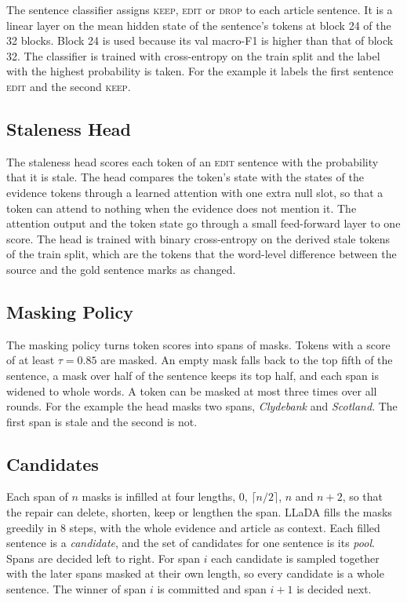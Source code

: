 \documentclass[]{paper}
\newcommand{\keep}{\textsc{keep}}
\newcommand{\edit}{\textsc{edit}}
\newcommand{\drop}{\textsc{drop}}
\begin{document}
The sentence classifier assigns \keep{}, \edit{} or \drop{} to each article sentence. It is a linear layer on the mean hidden state of the sentence's tokens at block 24 of the 32 blocks. Block 24 is used because its val macro-F1 is higher than that of block 32. The classifier is trained with cross-entropy on the train split and the label with the highest probability is taken. For the example it labels the first sentence \edit{} and the second \keep{}.

\subsection{Staleness Head}

The staleness head scores each token of an \edit{} sentence with the probability that it is stale. The head compares the token's state with the states of the evidence tokens through a learned attention with one extra null slot, so that a token can attend to nothing when the evidence does not mention it. The attention output and the token state go through a small feed-forward layer to one score. The head is trained with binary cross-entropy on the derived stale tokens of the train split, which are the tokens that the word-level difference between the source and the gold sentence marks as changed.

\subsection{Masking Policy}

The masking policy turns token scores into spans of masks. Tokens with a score of at least $\tau = 0.85$ are masked. An empty mask falls back to the top fifth of the sentence, a mask over half of the sentence keeps its top half, and each span is widened to whole words. A token can be masked at most three times over all rounds. For the example the head masks two spans, \emph{Clydebank} and \emph{Scotland}. The first span is stale and the second is not.

\subsection{Candidates}

Each span of $n$ masks is infilled at four lengths, $0$, $\lceil n/2 \rceil$, $n$ and $n+2$, so that the repair can delete, shorten, keep or lengthen the span. LLaDA fills the masks greedily in 8 steps, with the whole evidence and article as context. Each filled sentence is a \emph{candidate}, and the set of candidates for one sentence is its \emph{pool}. Spans are decided left to right. For span $i$ each candidate is sampled together with the later spans masked at their own length, so every candidate is a whole sentence. The winner of span $i$ is committed and span $i+1$ is decided next.
\end{document}
